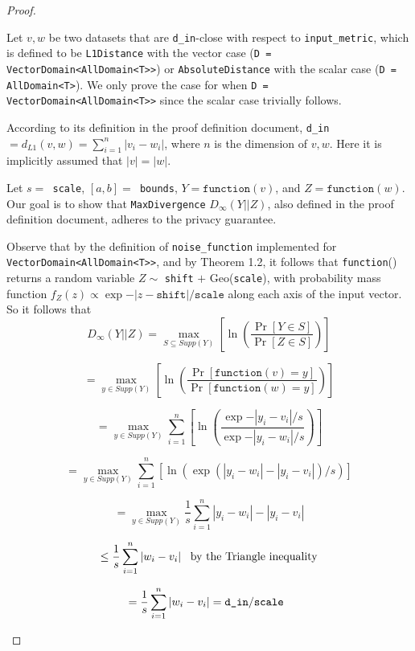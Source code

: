 \documentclass[11pt,a4paper]{article}
\newcommand{\function}{\texttt{function}}
\begin{document}
\begin{proof}
\begin{enumerate}
    Let $v,w$ be two datasets that are \texttt{d\_in}-close with respect to \texttt{input\_metric}, which is defined to be
    \texttt{L1Distance} with the vector case (\texttt{D = VectorDomain<AllDomain<T>>}) or \texttt{AbsoluteDistance} with the scalar case (\texttt{D = AllDomain<T>}). We only prove the case for when \texttt{D = VectorDomain<AllDomain<T>>} since the scalar case trivially follows.  
    
    According to its definition 
    in the proof definition document, \texttt{d\_in}$=d_{L1}(v,w)=\sum ^n_{i=1}|v_i-w_i|$,
    where $n$ is the dimension of $v,w$.
    Here it is implicitly assumed that $|v|=|w|$.
    
    Let $s=$\texttt{ scale}, $[a,b]=$\texttt{ bounds},
    $Y=\function(v)$, and $Z=\function(w)$.
    Our goal is to show that \texttt{MaxDivergence}  $D_{\infty}(Y||Z)$, also defined in the proof definition document, adheres to the privacy guarantee.
    
    Observe that by the definition of \texttt{noise\_function} implemented for \texttt{VectorDomain<AllDomain<T>>}, and by Theorem 1.2, it follows that \texttt{function}() returns a random variable $Z \sim $ 
    \texttt{shift} $+ 
    \text{ Geo}$(\texttt{scale}), with
    probability mass function
    $f_Z(z)\propto \exp{-|z-\texttt{shift}|/\texttt{scale}}$ along each axis of the input vector. So it follows that 
     \[
    D_{\infty}(Y||Z) = \max_{S \subseteq Supp(Y)}\left[\ln (\frac{\Pr[Y \in S]}{\Pr[Z \in S]})\right] 
    \]
    
    \[
    = \max_{y\in Supp(Y)}\left[\ln (\frac{\Pr[
    \function(v) = y]}
    {\Pr[\function(w) = y]})\right]
    \]
    
    \[
    = \max_{y\in Supp(Y)}\sum^n_{i=1}\left[\ln (\frac{\exp{-|y_i-v_i|/s}}
    {\exp{-|y_i-w_i|/s}})\right]
    \]
    
    \[
    = \max_{y\in Supp(Y)}\sum^n_{i=1}\left[\ln (\exp{(|y_i-w_i|-|y_i-v_i|)/s})\right]
    \]
    
    \[= \max_{y\in Supp(Y)}\frac{1}{s} \sum^n_{i=1}
    |y_i-w_i|-|y_i-v_i|\]
    
    
    \[
    \leq \frac{1}{s} \sum^n_{i=1}|w_i-v_i| \hspace{5px} \textrm{  by the Triangle inequality}
    \]
    
    \[
    =\frac{1}{s}\sum^n_{i=1}|w_i-v_i|
    =\texttt{d\_in}/\texttt{scale} \hspace{5px} 
    \]
    

\end{enumerate}
\end{proof}
\end{document}
